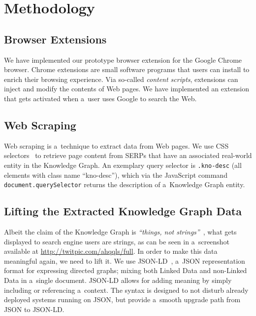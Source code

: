 \documentclass[runningheads,a4paper]{llncs}
\begin{document}
\section{Methodology} \label{sec:methodology}
\subsection{Browser Extensions}
We have implemented our prototype browser extension for the Google Chrome browser.
Chrome extensions are small software programs that users can install
to enrich their browsing experience.
Via so-called \emph{content scripts},
extensions can inject and modify the contents of Web pages.
We have implemented an extension that gets activated when a~user
uses Google to search the Web.

\subsection{Web Scraping}
Web scraping is a~technique to extract data from Web pages.
We use CSS selectors~\cite{hunt2012} to retrieve page content from SERPs
that have an associated real-world entity in the Knowledge Graph.
An exemplary query selector is \texttt{.kno-desc}
(all elements with class name ``kno-desc''),
which via the JavaScript command \texttt{document.querySelector}
returns the description of a~Knowledge Graph entity.

\subsection{Lifting the Extracted Knowledge Graph Data} \label{sec:lifting}
Albeit the claim of the Knowledge Graph is
\textit{``things, not strings''}~\cite{singhal2012_1},
what gets displayed to search engine users are strings,
as can be seen in a~screenshot available at \url{http://twitpic.com/ahqqls/full}.
In order to make this data meaningful again, we need to lift it.
We use JSON-LD~\cite{sporny2012}, a~JSON representation format
for expressing directed graphs;
mixing both Linked Data and non-Linked Data in a~single document.
JSON-LD allows for adding meaning by simply including or referencing a~context.
The syntax is designed to not disturb already deployed systems running on JSON,
but provide a~smooth upgrade path from JSON to JSON-LD.
\end{document}
